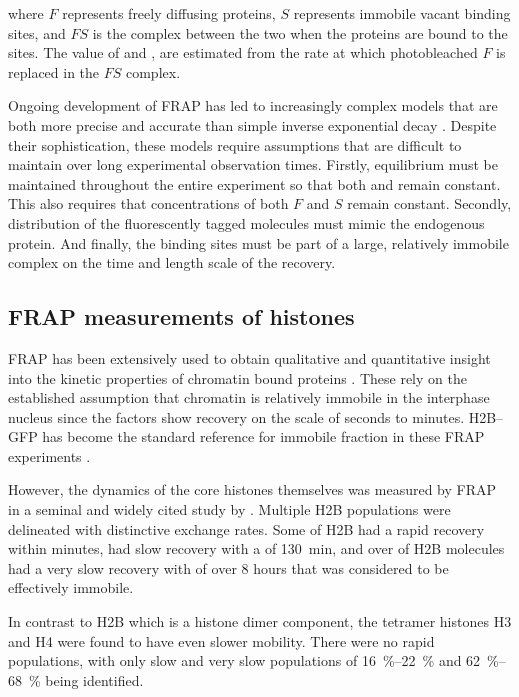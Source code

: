     where $F$ represents freely diffusing proteins,
    $S$ represents immobile vacant binding sites,
    and $FS$ is the complex between the two when the proteins are bound to the sites. 
    The value of \Kon{} and \Koff{},
    are estimated from the rate at which photobleached $F$ is replaced in the $FS$ complex.

    Ongoing development of FRAP has led to increasingly complex models
    that are both more precise and accurate than simple
    inverse exponential decay \citep{mcnally-frap-2010}.
    Despite their sophistication, these models require assumptions
    that are difficult to maintain over long experimental observation times.
    Firstly, equilibrium must be maintained throughout the entire experiment 
    so that both \Kon{} and \Koff{} remain constant.
    This also requires that concentrations of both $F$ and $S$ remain constant.
    Secondly, distribution of the fluorescently tagged molecules must mimic the endogenous protein.
    And finally, the binding sites must be part of a large, relatively immobile complex
    on the time and length scale of the recovery.

  \subsection{FRAP measurements of histones}

    FRAP has been extensively used to obtain qualitative and
    quantitative insight into the kinetic properties of chromatin bound
    proteins \citep{phair2000high, essers2005nuclear, agresti2005gr}.
    These rely on the established assumption that chromatin is
    relatively immobile in the interphase nucleus
    \citep{abney1997chromatin} since the factors show recovery
    on the scale of seconds to minutes.
    H2B--GFP \citep{KevinH2BGFP} has become
    the standard reference for immobile fraction in these
    FRAP experiments \citep{dey2000bromodomain}.

    However, the dynamics of the core histones themselves was measured by FRAP in a seminal
    and widely cited study by \citet{KimuraCook}. Multiple H2B
    populations were delineated with distinctive exchange rates.  Some
     of H2B had a rapid recovery within minutes, 
    had slow recovery with a \halflife[] of \SI{130}{\minute},
    and over  of H2B molecules had a very slow recovery with \halflife[] of
    over 8 hours that was considered to be effectively immobile.

    In contrast to H2B which is a histone dimer component, the tetramer
    histones H3 and H4 were found to have even slower mobility.  There
    were no rapid populations, with only slow and very slow populations
    of \SIrange{16}{22}{\percent} and \SIrange{62}{68}{\percent} being
    identified.

